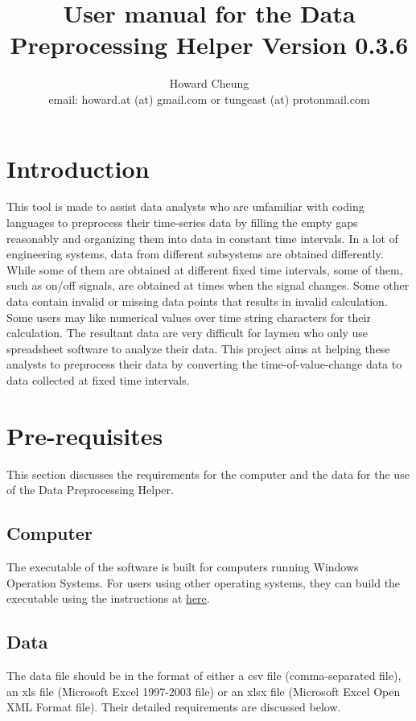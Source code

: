 \documentclass[12pt,a4paper]{article}
\author{Howard Cheung \\ email: howard.at (at) gmail.com or tungeast (at) protonmail.com}
\title{User manual for the Data Preprocessing Helper Version 0.3.6}
\begin{document}
\maketitle

\tableofcontents

\section{Introduction}

This tool is made to assist data analysts who are unfamiliar with coding languages to preprocess their time-series data by filling the empty gaps reasonably and organizing them into data in constant time intervals.
In a lot of engineering systems, data from different subsystems are obtained differently.
While some of them are obtained at different fixed time intervals, some of them, such as on/off signals, are obtained at times when the signal changes.
Some other data contain invalid or missing data points that results in invalid calculation.
Some users may like numerical values over time string characters for their calculation.
The resultant data are very difficult for laymen who only use spreadsheet software to analyze their data.
This project aims at helping these analysts to preprocess their data by converting the time-of-value-change data to data collected at fixed time intervals.

\section{Pre-requisites}
This section discusses the requirements for the computer and the data for the use of the Data Preprocessing Helper.

\subsection{Computer}
The executable of the software is built for computers running Windows Operation Systems.
For users using other operating systems, they can build the executable using the instructions at \href{https://github.com/howardcheung/data-preprocessing-helper/blob/master/exe/README.md}{here}.

\subsection{Data}
The data file should be in the format of either a csv file (comma-separated file), an xls file (Microsoft Excel 1997-2003 file) or an xlsx file (Microsoft Excel Open XML Format file). Their detailed requirements are discussed below.
\end{document}
